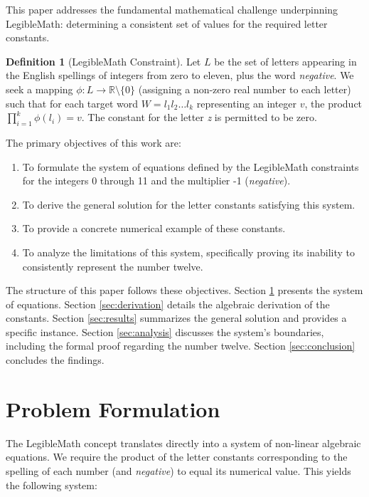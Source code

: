 \documentclass[12pt,a4paper]{article}
\theoremstyle{plain}
\theoremstyle{definition}
\newtheorem{definition}[theorem]{Definition}
\begin{document}
This paper addresses the fundamental mathematical challenge underpinning LegibleMath: determining a consistent set of values for the required letter constants.

\begin{definition}[LegibleMath Constraint]
Let $L$ be the set of letters appearing in the English spellings of integers from zero to eleven, plus the word \emph{negative}. We seek a mapping $\phi: L \to \mathbb{R} \setminus \{0\}$ (assigning a non-zero real number to each letter) such that for each target word $W = l_1 l_2 \dots l_k$ representing an integer $v$, the product $\prod_{i=1}^{k} \phi(l_i) = v$. The constant for the letter \emph{z} is permitted to be zero.
\end{definition}

The primary objectives of this work are:
\begin{enumerate}
    \item To formulate the system of equations defined by the LegibleMath constraints for the integers 0 through 11 and the multiplier -1 (\emph{negative}).
    \item To derive the general solution for the letter constants satisfying this system.
    \item To provide a concrete numerical example of these constants.
    \item To analyze the limitations of this system, specifically proving its inability to consistently represent the number twelve.
\end{enumerate}

The structure of this paper follows these objectives. Section \ref{sec:formulation} presents the system of equations. Section \ref{sec:derivation} details the algebraic derivation of the constants. Section \ref{sec:results} summarizes the general solution and provides a specific instance. Section \ref{sec:analysis} discusses the system's boundaries, including the formal proof regarding the number twelve. Section \ref{sec:conclusion} concludes the findings.

\section{Problem Formulation}
\label{sec:formulation}

The LegibleMath concept translates directly into a system of non-linear algebraic equations. We require the product of the letter constants corresponding to the spelling of each number (and \emph{negative}) to equal its numerical value. This yields the following system:
\end{document}
